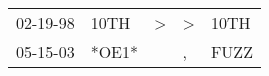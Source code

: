 \begin{supertabular}{p{0.07\textwidth}p{0.06\textwidth}p{0.02\textwidth}p{0.02\textwidth}p{0.06\textwidth}}
 02-19-98\textsuperscript{} &  10TH\textsuperscript{} &  \textgreater &  \textgreater &  10TH\textsuperscript{} \\
 05-15-03\textsuperscript{} &                   *OE1* &               &             , &  FUZZ\textsuperscript{} \\
\end{supertabular}
